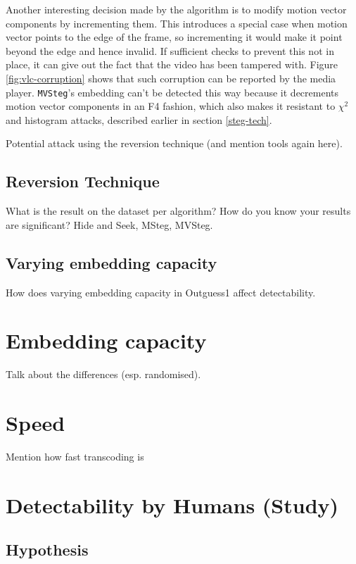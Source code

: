 \documentclass[12pt,british,twoside,notitlepage,usenames,dvipsnames,hypens,final]{report}
\numberwithin{equation}{section}
\numberwithin{figure}{section}
\begin{document}
Another interesting decision made by the algorithm is to modify motion vector components by incrementing them. This introduces a special case when motion vector points to the edge of the frame, so incrementing it would make it point beyond the edge and hence invalid. If sufficient checks to prevent this not in place, it can give out the fact that the video has been tampered with. Figure \ref{fig:vlc-corruption} shows that such corruption can be reported by the media player. \texttt{MVSteg}'s embedding can't be detected this way because it decrements motion vector components in an F4 fashion, which also makes it resistant to $\chi^2$ and histogram attacks, described earlier in section \ref{steg-tech}.



Potential attack using the reversion technique (and mention tools again here).

\subsection{Reversion Technique}
\label{rev-tech}

What is the result on the dataset per algorithm? How do you know your results are significant?
Hide and Seek, MSteg, MVSteg.

\subsection{Varying embedding capacity}
How does varying embedding capacity in Outguess1 affect detectability.

\section{Embedding capacity}

Talk about the differences (esp. randomised).

\section{Speed}

Mention how fast transcoding is

\section{Detectability by Humans (Study)}
\label{exp-human-subj}

\subsection{Hypothesis}
\end{document}
